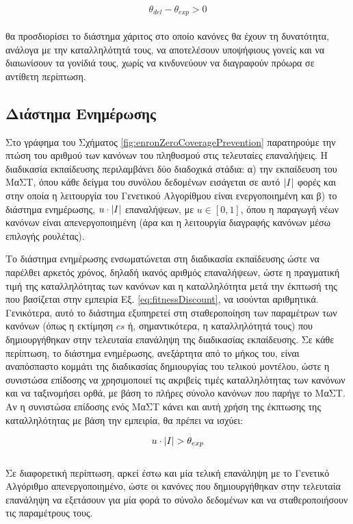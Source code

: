 \begin{equation}
\theta_{del}-\theta_{exp} > 0
\end{equation}
\\
θα προσδιορίσει το διάστημα χάριτος στο οποίο κανόνες θα έχουν τη δυνατότητα, ανάλογα με την καταλληλότητά τους, να αποτελέσουν υποψήφιους γονείς και να διαιωνίσουν τα γονίδιά τους, χωρίς να κινδυνεύουν να διαγραφούν πρόωρα σε αντίθετη περίπτωση.


\subsection{Διάστημα Ενημέρωσης}
Στο γράφημα του Σχήματος \ref{fig:enronZeroCoveragePrevention} παρατηρούμε την πτώση του αριθμού των κανόνων του πληθυσμού στις τελευταίες επαναλήψεις. Η διαδικασία εκπαίδευσης περιλαμβάνει δύο διαδοχικά στάδια: α) την εκπαίδευση του ΜαΣΤ, όπου κάθε δείγμα του συνόλου δεδομένων εισάγεται σε αυτό $\lvert I\rvert$ φορές και στην οποία η λειτουργία του Γενετικού Αλγορίθμου είναι ενεργοποιημένη και β) το διάστημα ενημέρωσης, $u \cdot \lvert I\rvert$ επαναλήψεων, με $u \in [0, 1]$, όπου η παραγωγή νέων κανόνων είναι απενεργοποιημένη (άρα και η λειτουργία διαγραφής κανόνων μέσω επιλογής ρουλέτας). 

Το διάστημα ενημέρωσης ενσωματώνεται στη διαδικασία εκπαίδευσης ώστε να παρέλθει αρκετός χρόνος, δηλαδή ικανός αριθμός επαναλήψεων, ώστε η πραγματική τιμή της καταλληλότητας των κανόνων και η καταλληλότητα μετά την έκπτωσή της που βασίζεται στην εμπειρία Εξ. \ref{eq:fitnessDiscount}, να ισούνται αριθμητικά. Γενικότερα, αυτό το διάστημα εξυπηρετεί στη σταθεροποίηση των παραμέτρων των κανόνων (όπως η εκτίμηση $cs$ ή, σημαντικότερα, η καταλληλότητά τους) που δημιουργήθηκαν στην τελευταία επανάληψη της διαδικασίας εκπαίδευσης. Σε κάθε περίπτωση, το διάστημα ενημέρωσης, ανεξάρτητα από το μήκος του, είναι αναπόσπαστο κομμάτι της διαδικασίας δημιουργίας του τελικού μοντέλου, ώστε η συνιστώσα επίδοσης να χρησιμοποιεί τις ακριβείς τιμές καταλληλότητας των κανόνων και να ταξινομήσει ορθά, με βάση το πλήρες σύνολο κανόνων που παρήγε το ΜαΣΤ. Αν η συνιστώσα επίδοσης ενός ΜαΣΤ κάνει και αυτή χρήση της έκπτωσης της καταλληλότητας με βάση την εμπειρία, θα πρέπει να ισχύει:

\begin{equation}
u \cdot \lvert I\rvert > \theta_{exp}
\end{equation}
\\
Σε διαφορετική περίπτωση, αρκεί έστω και μία τελική επανάληψη με το Γενετικό Αλγόριθμο απενεργοποιημένο, ώστε οι κανόνες που δημιουργήθηκαν στην τελευταία επανάληψη να εξετάσουν για μία φορά το σύνολο δεδομένων και να σταθεροποιήσουν τις παραμέτρους τους.

